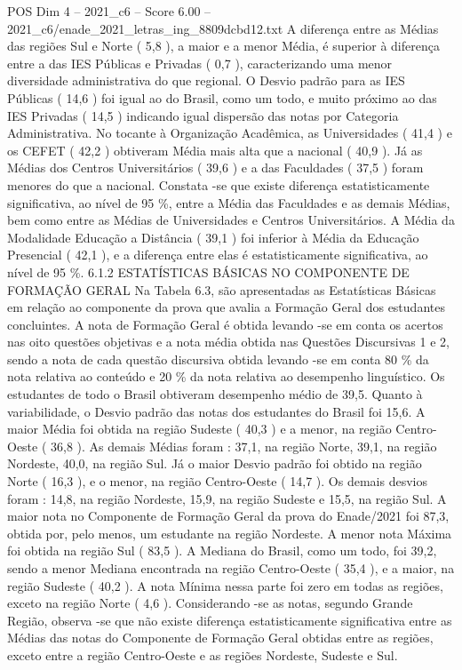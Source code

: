 \begin{textsample}{POS Dim 4 – 2021\_c6 – Score 6.00 – 2021\_c6/enade\_2021\_letras\_ing\_8809dcbd12.txt}
A diferença entre as Médias das regiões Sul e Norte ( 5,8 ), a maior e a menor Média, é superior à diferença entre a das IES Públicas e Privadas ( 0,7 ), caracterizando uma menor diversidade administrativa do que regional.
O Desvio padrão para as IES Públicas ( 14,6 ) foi igual ao do Brasil, como um todo, e muito próximo ao das IES Privadas ( 14,5 ) indicando igual dispersão das notas por Categoria Administrativa.
No tocante à Organização Acadêmica, as Universidades ( 41,4 ) e os CEFET ( 42,2 ) obtiveram Média mais alta que a nacional ( 40,9 ).
Já as Médias dos Centros Universitários ( 39,6 ) e a das Faculdades ( 37,5 ) foram menores do que a nacional.
Constata -se que existe diferença estatisticamente significativa, ao nível de 95 \%, entre a Média das Faculdades e as demais Médias, bem como entre as Médias de Universidades e Centros Universitários.
A Média da Modalidade Educação a Distância ( 39,1 ) foi inferior à Média da Educação Presencial ( 42,1 ), e a diferença entre elas é estatisticamente significativa, ao nível de 95 \%. 6.1.2 ESTATÍSTICAS BÁSICAS NO COMPONENTE DE FORMAÇÃO GERAL Na Tabela 6.3, são apresentadas as Estatísticas Básicas em relação ao componente da prova que avalia a Formação Geral dos estudantes concluintes.
A nota de Formação Geral é obtida levando -se em conta os acertos nas oito questões objetivas e a nota média obtida nas Questões Discursivas 1 e 2, sendo a nota de cada questão discursiva obtida levando -se em conta 80 \% da nota relativa ao conteúdo e 20 \% da nota relativa ao desempenho linguístico.
Os estudantes de todo o Brasil obtiveram desempenho médio de 39,5.
Quanto à variabilidade, o Desvio padrão das notas dos estudantes do Brasil foi 15,6.
A maior Média foi obtida na região Sudeste ( 40,3 ) e a menor, na região Centro-Oeste ( 36,8 ).
As demais Médias foram : 37,1, na região Norte, 39,1, na região Nordeste, 40,0, na região Sul.
Já o maior Desvio padrão foi obtido na região Norte ( 16,3 ), e o menor, na região Centro-Oeste ( 14,7 ).
Os demais desvios foram : 14,8, na região Nordeste, 15,9, na região Sudeste e 15,5, na região Sul.
A maior nota no Componente de Formação Geral da prova do Enade/2021 foi 87,3, obtida por, pelo menos, um estudante na região Nordeste.
A menor nota Máxima foi obtida na região Sul ( 83,5 ).
A Mediana do Brasil, como um todo, foi 39,2, sendo a menor Mediana encontrada na região Centro-Oeste ( 35,4 ), e a maior, na região Sudeste ( 40,2 ).
A nota Mínima nessa parte foi zero em todas as regiões, exceto na região Norte ( 4,6 ).
Considerando -se as notas, segundo Grande Região, observa -se que não existe diferença estatisticamente significativa entre as Médias das notas do Componente de Formação Geral obtidas entre as regiões, exceto entre a região Centro-Oeste e as regiões Nordeste, Sudeste e Sul.

\end{textsample}
